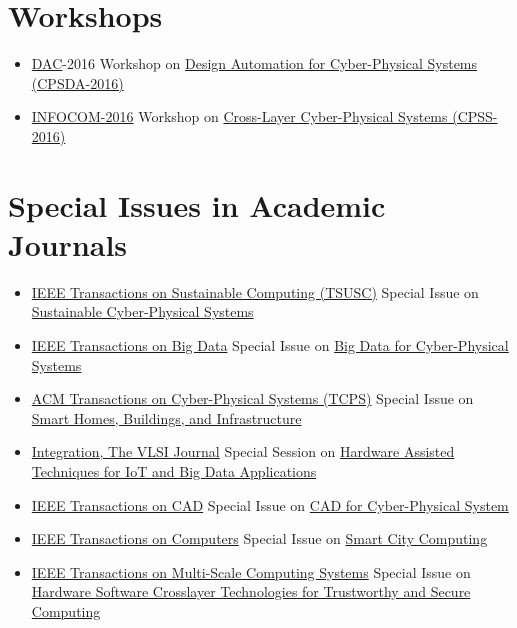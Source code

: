 
\setcounter{section}{0}

\section{Workshops}
\begin{itemize}
    \item \href{https://dac.com/}{DAC}-2016 Workshop on \href{http://www.ieee-cps.org/CPSDA-2016/}{Design Automation for Cyber-Physical Systems (CPSDA-2016)}
    \item \href{http://infocom2016.ieee-infocom.org}{INFOCOM-2016} Workshop on \href{http://www.ieee-cps.org/CPSS-2016/}{Cross-Layer Cyber-Physical Systems (CPSS-2016)}
\end{itemize}

\section{Special Issues in Academic Journals}
\begin{itemize}
    \item
    \href{http://www.computer.org/web/tsusc}{IEEE Transactions on Sustainable Computing (TSUSC)} Special Issue on
    \href{http://www.ieee-cps.org/TSUSC-CPS.html}{Sustainable Cyber-Physical Systems}
    \item
    \href{http://www.computer.org/web/tbd}{IEEE Transactions on Big Data} Special Issue on
    \href{http://www.ieee-cps.org/TBD-CPS.html}{Big Data for Cyber-Physical Systems}
    \item
    \href{http://tcps.acm.org/}{ACM Transactions on Cyber-Physical Systems (TCPS)} Special Issue on
    \href{http://tcps.acm.org/special_issue_smart.cfm}{Smart Homes, Buildings, and Infrastructure}
    \item
    \href{http://www.journals.elsevier.com/integration-the-vlsi-journal/}{Integration, The VLSI Journal} Special Session on
    \href{http://www.journals.elsevier.com/integration-the-vlsi-journal/call-for-papers/special-issue-on-hardware-assisted-techniques-for-iot/}{Hardware Assisted Techniques for IoT and Big Data Applications}
    \item 
    \href{http://ieee-ceda.org/publications/tcad}{IEEE Transactions on CAD} Special Issue on
    \href{http://ieee-ceda.org/images/tcad2/cfp_cyperphysical_tcad.pdf}{CAD for Cyber-Physical System}
    \item
    \href{http://www.computer.org/web/tc}{IEEE Transactions on Computers} Special Issue on
    \href{http://www.computer.org/cms/Computer.org/transactions/cfps/cfp_tcsi_stscc.pdf}{Smart City Computing}
    \item
    \href{http://www.computer.org/web/tmscs}{IEEE Transactions on Multi-Scale Computing Systems} Special Issue on
    \href{http://www.computer.org/cms/Computer.org/transactions/cfps/cfp_tmscssi_hsclttsc.pdf}{Hardware Software Crosslayer Technologies for Trustworthy and Secure Computing}
\end{itemize}

